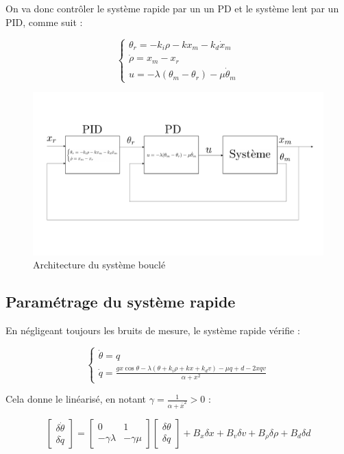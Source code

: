 \documentclass[10pt]{article}
\begin{document}
\noindent On va donc contrôler le système rapide par un un PD et le système lent par un PID, comme suit :

\[
	\begin{cases}
		\theta_r = - k_i \rho - k x_m - k_d \dot x_m \\
		\dot \rho = x_m - x_r \\
		u = - \lambda ( \theta_m - \theta_r ) - \mu \dot \theta_m
	\end{cases}
\]

\begin{figure}[H]
	\centering
	\includegraphics[width=\linewidth]{schemaPD+PID.pdf}
	\caption{Architecture du système bouclé}
\end{figure}

\subsection*{Paramétrage du système rapide}

\noindent En négligeant toujours les bruits de mesure, le système rapide vérifie :

\[
	\begin{cases}
		\dot \theta = q \\
		\dot q =
		\frac{gx \cos \theta - \lambda ( \theta + k_i \rho + k x + k_d v ) - \mu q + d - 2xqv}{\alpha + x^2}
	\end{cases}
\]

\noindent Cela donne le linéarisé, en notant $\gamma = \frac{1}{\alpha + \bar x^2} > 0$ :

\[
	\begin{bmatrix}
		\delta \dot \theta \\
		\delta \dot q
	\end{bmatrix}
	=\begin{bmatrix}
		0 & 1 \\
		- \gamma \lambda & - \gamma \mu
	\end{bmatrix}
	\begin{bmatrix}
		\delta \theta \\
		\delta q
	\end{bmatrix} +
	B_x \delta x +
	B_v \delta v +
	B_\rho \delta \rho +
	B_d \delta d
\]
\end{document}
